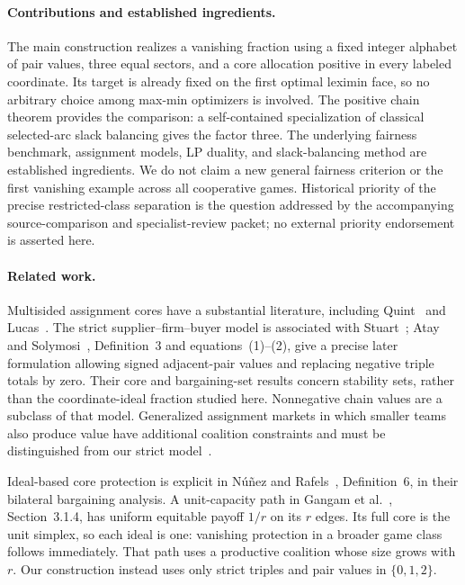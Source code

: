 \documentclass[11pt]{article}
\theoremstyle{remark}\newtheorem{remark}[theorem]{Remark}
\begin{document}
\paragraph{Contributions and established ingredients.}
The main construction realizes a vanishing fraction using a fixed integer
alphabet of pair values, three equal sectors, and a core allocation positive
in every labeled coordinate. Its target is already fixed on the first
optimal leximin face, so no arbitrary choice among max-min optimizers is
involved. The positive chain theorem provides the comparison: a
self-contained specialization of classical selected-arc slack balancing
gives the factor three. The underlying fairness benchmark, assignment
models, LP duality, and slack-balancing method are established ingredients.
We do not claim a new general fairness criterion or the first vanishing
example across all cooperative games. Historical priority of the precise
restricted-class separation is the question addressed by the accompanying
source-comparison and specialist-review packet; no external priority
endorsement is asserted here.

\paragraph{Related work.}
Multisided assignment cores have a substantial literature, including
Quint~\cite{Quint1991} and Lucas~\cite{Lucas1995}. The strict
supplier--firm--buyer model is associated with Stuart~\cite{Stuart1997};
Atay and Solymosi~\cite{AtaySolymosi2018}, Definition~3 and equations~(1)--(2),
give a precise later formulation allowing signed adjacent-pair values and
replacing negative triple totals by zero. Their core and bargaining-set
results concern stability sets, rather than the coordinate-ideal fraction
studied here. Nonnegative chain values are a subclass of that model.
Generalized assignment markets in which smaller teams also produce value
have additional coalition constraints and must be distinguished from our
strict model~\cite{AtayNunez2020}.

Ideal-based core protection is explicit in N\'u\~nez and
Rafels~\cite{NunezRafels2004}, Definition~6, in their bilateral bargaining
analysis. A unit-capacity path in Gangam et al.~\cite{Gangam2025},
Section~3.1.4, has uniform equitable payoff $1/r$ on its $r$ edges.
Its full core is the unit simplex, so each ideal is one: vanishing
protection in a broader game class follows immediately. That path uses a
productive coalition whose size grows with $r$. Our construction instead
uses only strict triples and pair values in $\{0,1,2\}$.
\end{document}
